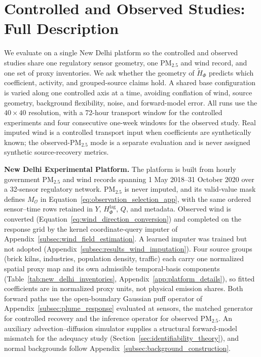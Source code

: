 \section{Controlled and Observed Studies: Full Description}
\label{app:pollution_experiments}
\label{sec:evaluation}

We evaluate on a single New Delhi platform so the controlled and observed studies
share one regulatory sensor geometry, one PM\(_{2.5}\) and wind record, and one set
of proxy inventories.  We ask whether the geometry of \(\widetilde H_\Phi\) predicts
which coefficient, activity, and grouped-source claims hold.  A shared
base configuration is varied along one controlled axis at a time, avoiding
conflation of wind, source geometry, background flexibility, noise, and
forward-model error.  All runs use the \(40\times40\)
resolution, with a 72-hour transport window for the controlled experiments and
four consecutive one-week windows for the observed study.  Real imputed wind is a
controlled transport input when coefficients are synthetically known; the
observed-PM\(_{2.5}\) mode is a separate evaluation and is never assigned synthetic
source-recovery metrics.

\noindent\textbf{New Delhi Experimental Platform.}
The platform is built from hourly government PM\(_{2.5}\) and wind records
\citep{cpcb,cpcb_portal} spanning 1 May 2018--31 October 2020 over a 32-sensor
regulatory network.  PM\(_{2.5}\) is never imputed, and its valid-value mask defines
\(M_{\mathcal O}\) in Equation~\ref{eq:observation_selection_app}, with the same
ordered sensor--time rows retained in \(Y\), \(H_\Phi^{\mathrm{lag}}\), \(Q\), and
metadata.  Observed wind is converted (Equation~\ref{eq:wind_direction_conversion})
and completed on the response grid by the kernel coordinate-query imputer of
Appendix~\ref{subsec:wind_field_estimation}\label{subsec:new_delhi_wind}.  A learned
imputer was trained but not adopted (Appendix~\ref{subsec:results_wind_imputation}).
Four source groups (brick kilns, industries, population density, traffic) each
carry one normalized spatial proxy map and its own admissible temporal-basis
components (Table~\ref{tab:new_delhi_inventories},
Appendix~\ref{app:platform_details}), so fitted coefficients are in normalized
proxy units, not physical emission shares.  Both forward paths use the
open-boundary Gaussian puff operator of Appendix~\ref{subsec:plume_response}
evaluated at sensors, the matched generator for controlled recovery and the
inference operator for observed PM\(_{2.5}\).  An auxiliary advection--diffusion
simulator supplies a structural forward-model mismatch for the adequacy study
(Section~\ref{sec:identifiability_theory}), and normal backgrounds follow
Appendix~\ref{subsec:background_construction}.

